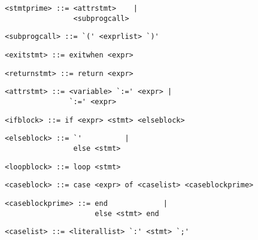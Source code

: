 \begin{footnotesize}
\begin{lstlisting}[frame=single, label={stmtprime}, language=pie]
<stmtprime> ::= <attrstmt>    |
                <subprogcall>
\end{lstlisting}

\begin{lstlisting}[frame=single, label={subprogcall}, language=pie]
<subprogcall> ::= `(' <exprlist> `)'
\end{lstlisting}

\begin{lstlisting}[frame=single, label={exitstmt}, language=pie]
<exitstmt> ::= exitwhen <expr>
\end{lstlisting}

\begin{lstlisting}[frame=single, label={returnstmt}, language=pie]
<returnstmt> ::= return <expr>
\end{lstlisting}

\begin{lstlisting}[frame=single, label={attrstmt}, language=pie]
<attrstmt> ::= <variable> `:=' <expr> |
               `:=' <expr>
\end{lstlisting}

\begin{lstlisting}[frame=single, label={ifblock}, language=pie]
<ifblock> ::= if <expr> <stmt> <elseblock>
\end{lstlisting}


\begin{lstlisting}[frame=single, label={elseblock}, language=pie]
<elseblock> ::= `'          |
                else <stmt>
\end{lstlisting}

\begin{lstlisting}[frame=single, label={loopblock}, language=pie]
<loopblock> ::= loop <stmt>
\end{lstlisting}

\begin{lstlisting}[frame=single, label={caseblock}, language=pie]
<caseblock> ::= case <expr> of <caselist> <caseblockprime>
\end{lstlisting}

\begin{lstlisting}[frame=single, label={caseblockprime}, language=pie]
<caseblockprime> ::= end             |
                     else <stmt> end
\end{lstlisting}

\begin{lstlisting}[frame=single, label={caselist}, language=pie]
<caselist> ::= <literallist> `:' <stmt> `;'
\end{lstlisting}


\end{footnotesize}
